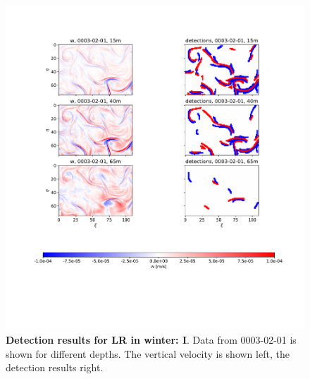 \begin{figure}
    \centering
    \includegraphics[width=16cm, trim=2.5cm 0 0 2cm]{figures/eval_det_meso_winter.pdf}
    \caption[Detection results for LR in winter: I]{\textbf{Detection results for LR in winter: I}. Data from 0003-02-01 is shown for different depths. The vertical velocity is shown left, the detection results right.}\label{fig:subm_det_winter_meso}
\end{figure}

